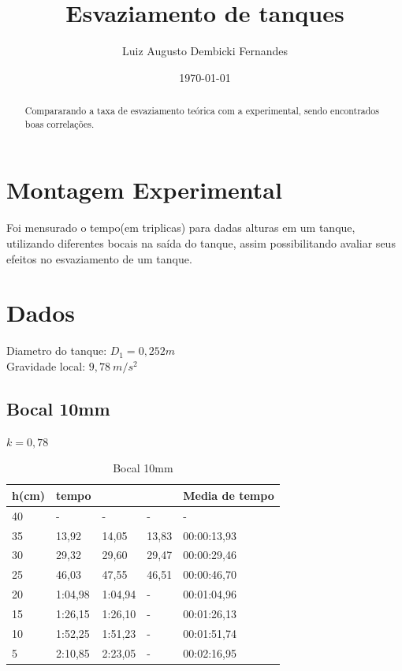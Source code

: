\documentclass[12pt]{article}
\begin{document}
\title{Esvaziamento de tanques}
\author{Luiz Augusto Dembicki Fernandes}
\date{\today}

\maketitle

\begin{abstract}
Compararando a taxa de esvaziamento teórica com a experimental, sendo encontrados boas correlações. 
\end{abstract}

\section{Montagem Experimental}

\tab  Foi mensurado o tempo(em triplicas) para dadas alturas em um tanque, utilizando diferentes bocais na saída do tanque, assim possibilitando avaliar seus efeitos no esvaziamento de um tanque.

\section{Dados}
Diametro do tanque: $ D_1 = 0,252m $ \\
Gravidade local: $ 9,78 \ m/s^2 $
\subsection[short]{Bocal 10mm}
$ k = 0,78 $
\begin{table}[H]
    \begin{tabular}{|l|lll|l|}
        \hline
        h(cm) & tempo                        &                              &       & Media de tempo \\ \hline
        40    & \multicolumn{1}{l|}{-}       & \multicolumn{1}{l|}{-}       & -     & -              \\ \hline
        35    & \multicolumn{1}{l|}{13,92}   & \multicolumn{1}{l|}{14,05}   & 13,83 & 00:00:13,93    \\ \hline
        30    & \multicolumn{1}{l|}{29,32}   & \multicolumn{1}{l|}{29,60}   & 29,47 & 00:00:29,46    \\ \hline
        25    & \multicolumn{1}{l|}{46,03}   & \multicolumn{1}{l|}{47,55}   & 46,51 & 00:00:46,70    \\ \hline
        20    & \multicolumn{1}{l|}{1:04,98} & \multicolumn{1}{l|}{1:04,94} & -     & 00:01:04,96    \\ \hline
        15    & \multicolumn{1}{l|}{1:26,15} & \multicolumn{1}{l|}{1:26,10} & -     & 00:01:26,13    \\ \hline
        10    & \multicolumn{1}{l|}{1:52,25} & \multicolumn{1}{l|}{1:51,23} & -     & 00:01:51,74    \\ \hline
        5     & \multicolumn{1}{l|}{2:10,85} & \multicolumn{1}{l|}{2:23,05} & -     & 00:02:16,95    \\ \hline
    \end{tabular}
    \caption{Bocal 10mm}
\end{table}
\end{document}
